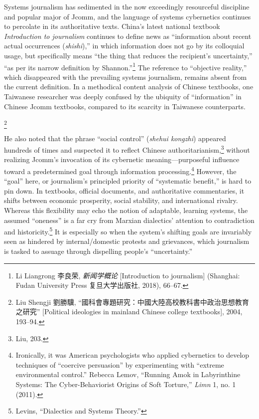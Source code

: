 \documentclass{tufte-handout}
\begin{document}
\begin{CJK*}{UTF8}{gbsn}
Systems journalism has sedimented in the now exceedingly resourceful
discipline and popular major of Jcomm, and the language of systems
cybernetics continues to percolate in its authoritative texts. China's
latest national textbook \emph{Introduction to journalism} continues to
define news as ``information about recent actual occurrences
(\emph{shishi}),'' in which information does not go by its colloquial
usage, but specifically means ``the thing that reduces the recipient's
uncertainty,'' ``as per its narrow definition by Shannon.''\footnote{Li
  Liangrong 李良荣, \emph{新闻学概论} {[}Introduction to journalism{]}
  (Shanghai: Fudan University Press 复旦大学出版社, 2018), 66--67.} The
reference to ``objective reality,'' which disappeared with the
prevailing systems journalism, remains absent from the current
definition. In a methodical content analysis of Chinese textbooks, one
Taiwanese researcher was deeply confused by the ubiquity of
``information'' in Chinese Jcomm textbooks, compared to its scarcity in
Taiwanese counterparts.\begin{CJK*}{UTF8}{bsmi}\footnote{Liu Shengji 劉勝驥,
  ``國科會專題研究：中國大陸高校教科書中政治思想教育之研究''
  {[}Political ideologies in mainland Chinese college textbooks{]},
  2004, 193--94.}\end{CJK*}\begin{CJK*}{UTF8}{gbsn} He also noted that the phrase ``social control''
(\emph{shehui kongzhi}) appeared hundreds of times and suspected it to
reflect Chinese authoritarianism,\footnote{Liu, 203.} without realizing
Jcomm's invocation of its cybernetic meaning---purposeful influence
toward a predetermined goal through information processing.\footnote{Ironically,
  it was American psychologists who applied cybernetics to develop
  techniques of ``coercive persuasion'' by experimenting with ``extreme
  environmental control.'' Rebecca Lemov, ``Running Amok in Labyrinthine
  Systems: The Cyber-Behaviorist Origins of Soft Torture,'' \emph{Limn}
  1, no. 1 (2011).} However, the ``goal'' here, or journalism's
principled priority of ``systematic benefit,'' is hard to pin down. In
textbooks, official documents, and authoritative commentaries, it shifts
between economic prosperity, social stability, and international
rivalry. Whereas this flexibility may echo the notion of adaptable,
learning systems, the assumed ``oneness'' is a far cry from Marxian
dialectics' attention to contradiction and historicity.\footnote{Levins,
  ``Dialectics and Systems Theory.''} It is especially so when the
system's shifting goals are invariably seen as hindered by
internal/domestic protests and grievances, which journalism is tasked to
assuage through dispelling people's ``uncertainty.''


\end{CJK*}
\end{CJK*}
\end{document}
